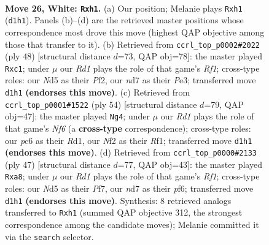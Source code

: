 \documentclass[11pt]{article}
\begin{document}
\clearpage

\begin{figure}[p]\centering
\begin{subfigure}{0.46\textwidth}\centering
\resizebox{\linewidth}{!}{%
\newchessgame
\chessboard[
  setfen={rnb3k1/3n4/2p5/pp1N4/8/6P1/PPP1BN2/1K1R3r w - - 0 26},
  showmover=false,
  pgfstyle=straightmove, color=movearrow, markmove={d1-h1}
]}
\caption{}
\end{subfigure}\hfill
\begin{subfigure}{0.46\textwidth}\centering
\resizebox{\linewidth}{!}{%
\newchessgame
\chessboard[
  setfen={3r2k1/p2n1pp1/5n1p/3p4/NP6/4P2P/4NPP1/2r2RK1 w - - 0 25},
  showmover=false,
  pgfstyle=straightmove, color=movearrow, markmove={f1-c1}
]}
\caption{}
\end{subfigure}
\\[4pt]
\begin{subfigure}{0.46\textwidth}\centering
\resizebox{\linewidth}{!}{%
\newchessgame
\chessboard[
  setfen={5r2/p5k1/5Np1/1p2p3/3nP3/4B2P/rb4PK/3R1R2 w - - 4 28},
  showmover=false,
  pgfstyle=straightmove, color=movearrow, markmove={f6-g4}
]}
\caption{}
\end{subfigure}\hfill
\begin{subfigure}{0.46\textwidth}\centering
\resizebox{\linewidth}{!}{%
\newchessgame
\chessboard[
  setfen={R4r1k/1B1n1p1p/4pP2/1p6/5n2/5N2/1P1K1P1P/8 b - - 2 24},
  showmover=false,
  pgfstyle=straightmove, color=movearrow, markmove={f8-a8}
]}
\caption{}
\end{subfigure}
\caption{\textbf{Move 26, White: \texttt{Rxh1}.} (a) Our position; Melanie plays \texttt{Rxh1} (\texttt{d1h1}). Panels (b)--(d) are the retrieved master positions whose correspondence most drove this move (highest QAP objective among those that transfer to it). (b) Retrieved from \texttt{ccrl\_top\_p0002\#2022} (ply 48) [structural distance $d$=73, QAP obj=78]: the master played \texttt{Rxc1}; under $\mu$ our \emph{Rd1} plays the role of that game's \emph{Rf1}; cross-type roles: our \emph{N}d5 as their \emph{P}f2, our \emph{n}d7 as their \emph{P}e3; transferred move \texttt{d1h1} \textbf{(endorses this move)}. (c) Retrieved from \texttt{ccrl\_top\_p0001\#1522} (ply 54) [structural distance $d$=79, QAP obj=47]: the master played \texttt{Ng4}; under $\mu$ our \emph{Rd1} plays the role of that game's \emph{Nf6} (a \textbf{cross-type} correspondence); cross-type roles: our \emph{p}c6 as their \emph{R}d1, our \emph{N}f2 as their \emph{R}f1; transferred move \texttt{d1h1} \textbf{(endorses this move)}. (d) Retrieved from \texttt{ccrl\_top\_p0000\#2133} (ply 47) [structural distance $d$=77, QAP obj=43]: the master played \texttt{Rxa8}; under $\mu$ our \emph{Rd1} plays the role of that game's \emph{Rf1}; cross-type roles: our \emph{N}d5 as their \emph{P}f7, our \emph{n}d7 as their \emph{p}f6; transferred move \texttt{d1h1} \textbf{(endorses this move)}. Synthesis: 8 retrieved analogs transferred to \texttt{Rxh1} (summed QAP objective 312, the strongest correspondence among the candidate moves); Melanie committed it via the \texttt{search} selector.}
\label{fig:thought-m50}
\end{figure}
\end{document}

